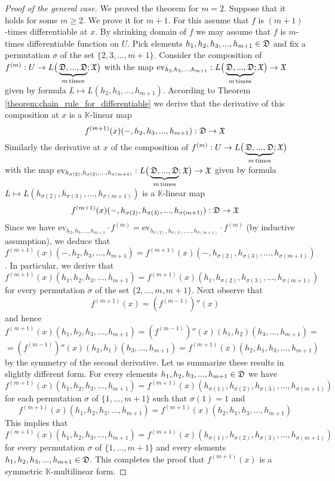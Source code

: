 \begin{proof}[Proof of the general case]
We proved the theorem for $m = 2$. Suppose that it holds for some $m \geq 2$. We prove it for $m + 1$. For this assume that $f$ is $(m+1)$-times differentiable at $x$. By shrinking domain of $f$ we may assume that $f$ is $m$-times differentiable function on $U$. Pick elements $h_1,h_2,h_3,...,h_{m+1}\in {\mathfrak D}$ and fix a permutation $\sigma$ of the set $\{2,3,...,m+1\}$. Consider the composition of $f^{(m)}:U\rightarrow L\big(\underbrace{{\mathfrak D},...,{\mathfrak D}}_{m\,\mathrm{times}};{\mathfrak X}\big)$ with the map $\mathrm{ev}_{h_2,h_3,...,h_{m+1}}:L\big(\underbrace{{\mathfrak D},...,{\mathfrak D}}_{m\,\mathrm{times}};{\mathfrak X}\big) \rightarrow {\mathfrak X}$ given by formula $L\mapsto L(h_2,h_3,...,h_{m+1})$. According to Theorem \ref{theorem:chain_rule_for_differentiable} we derive that the derivative of this composition at $x$ is a $\mathbb{K}$-linear map 
$$f^{(m+1)}(x)(-,h_2,h_3,...,h_{m+1}):{\mathfrak D}\rightarrow {\mathfrak X}$$
Similarly the derivative at $x$ of the composition of $f^{(m)}:U\rightarrow L\big(\underbrace{{\mathfrak D},...,{\mathfrak D}}_{m\,\mathrm{times}};{\mathfrak X}\big)$ with the map $\mathrm{ev}_{h_{\sigma(2)},h_{\sigma(3)},...,h_{\sigma(m+1)}}:L\big(\underbrace{{\mathfrak D},...,{\mathfrak D}}_{m\,\mathrm{times}};{\mathfrak X}\big) \rightarrow {\mathfrak X}$ given by formula $L\mapsto L(h_{\sigma(2)},h_{\sigma(3)},...,h_{\sigma(m+1)})$ is a $\mathbb{K}$-linear map
$$f^{(m+1)}(x)(-,h_{\sigma(2)},h_{\sigma(3)},...,h_{\sigma(m+1)}):{\mathfrak D}\rightarrow {\mathfrak X}$$
Since we have $\mathrm{ev}_{h_2,h_3,...,h_{m+1}} \cdot f^{(m)} = \mathrm{ev}_{h_{\sigma(2)},h_{\sigma(3)},...,h_{\sigma(m+1)}} \cdot f^{(m)}$ (by inductive assumption), we deduce that $f^{(m+1)}(x)(-,h_2,h_3,...,h_{m+1}) = f^{(m+1)}(x)(-,h_{\sigma(2)},h_{\sigma(3)},...,h_{\sigma(m+1)})$. In particular, we derive that 
$$f^{(m+1)}(x)(h_1,h_2,h_3,...,h_{m+1}) = f^{(m+1)}(x)(h_1,h_{\sigma(2)},h_{\sigma(3)},...,h_{\sigma(m+1)})$$
for every permutation $\sigma$ of the set $\{2,...,m,m+1\}$. Next observe that
$$f^{(m+1)}(x) = \left(f^{(m-1)}\right)''(x)$$
and hence
$$f^{(m+1)}(x)(h_1,h_2,h_3,...,h_{m+1}) = \left(f^{(m-1)}\right)''(x)(h_1,h_2)(h_3,...,h_{m+1}) =$$
$$= \left(f^{(m-1)}\right)''(x)(h_2,h_1)(h_3,...,h_{m+1}) = f^{(m+1)}(x)(h_2,h_1,h_3,...,h_{m+1})$$
by the symmetry of the second derivative. Let us summarize these results in slightly different form. For every elements $h_1,h_2,h_3,...,h_{m+1}\in {\mathfrak D}$ we have
$$f^{(m+1)}(x)(h_1,h_2,h_3,...,h_{m+1}) = f^{(m+1)}(x)(h_{\sigma(1)},h_{\sigma(2)},h_{\sigma(3)},...,h_{\sigma(m+1)})$$
for each permutation $\sigma$ of $\{1,...,m+1\}$ such that $\sigma(1) = 1$ and 
$$f^{(m+1)}(x)(h_1,h_2,h_3,...,h_{m+1}) = f^{(m+1)}(x)(h_2,h_1,h_3,...,h_{m+1})$$
This implies that
$$f^{(m+1)}(x)(h_1,h_2,h_3,...,h_{m+1}) = f^{(m+1)}(x)(h_{\sigma(1)},h_{\sigma(2)},h_{\sigma(3)},...,h_{\sigma(m+1)})$$
for every permutation $\sigma$ of $\{1,...,m+1\}$ and every elements $h_1,h_2,h_3,...,h_{m+1}\in {\mathfrak D}$. This completes the proof that $f^{(m+1)}(x)$ is a symmetric $\mathbb{K}$-multilinear form.
\end{proof}










